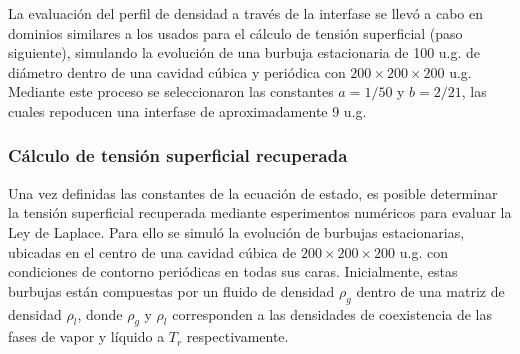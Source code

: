 La evaluaci\'on del perfil de densidad a trav\'es de la interfase se llev\'o a cabo en dominios similares a los usados para el c\'alculo de tensi\'on superficial (paso siguiente), simulando la evoluci\'on de una burbuja estacionaria de 100 u.g. de di\'ametro dentro de una cavidad c\'ubica y peri\'odica con $200 \times 200 \times 200$ u.g. Mediante este proceso se seleccionaron las constantes $a=1/50$ y $b=2/21$, las cuales repoducen una interfase de aproximadamente 9 u.g. 



\subsubsection{C\'alculo de tensi\'on superficial recuperada}

Una vez definidas las constantes de la ecuaci\'on de estado, es posible determinar la tensi\'on superficial recuperada mediante esperimentos num\'ericos para evaluar la Ley de Laplace. Para ello se simul\'o la evoluci\'on de burbujas estacionarias, ubicadas en el centro de una cavidad c\'ubica de $200 \times 200 \times 200$ u.g. con condiciones de contorno peri\'odicas en todas sus caras. Inicialmente, estas burbujas est\'an compuestas por un fluido de densidad $\rho_g$ dentro de una matriz de densidad $\rho_l$, donde $\rho_g$ y $\rho_l$ corresponden a las densidades de coexistencia de las fases de vapor y l\'iquido a $T_r$ respectivamente.

